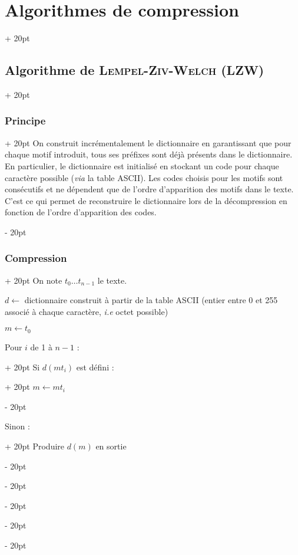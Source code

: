 \documentclass[a4paper, 12pt, twoside]{article}
\newcommand{\ind}[1][20pt]{\advance\leftskip + #1}
\newcommand{\deind}[1][20pt]{\advance\leftskip - #1}
\newenvironment{indt}[2][20pt]{#2 \par \ind[#1]}{\par \deind} %
\begin{document}
\begin{indt}{\section{Algorithmes de compression}}
\begin{indt}{\subsection{Algorithme de \textsc{Lempel-Ziv-Welch} (LZW)}}
            \vspace{12pt}
            
            \begin{indt}{\subsubsection{Principe}}
                On construit incrémentalement le dictionnaire en garantissant que pour chaque motif introduit, tous ses préfixes sont déjà présents dans le dictionnaire.
                En particulier, le dictionnaire est initialisé en stockant un code pour chaque caractère possible (\textit{via} la table ASCII). Les codes choisis pour les motifs sont consécutifs et ne dépendent que de l'ordre d'apparition des motifs dans le texte.
                C'est ce qui permet de reconstruire le dictionnaire lors de la décompression en fonction de l'ordre d'apparition des codes.
            \end{indt}

            \vspace{12pt}
            
            \begin{indt}{\subsubsection{Compression}}
                On note $t_0 \ldots t_{n - 1}$ le texte.

                \begin{pseudocode}
                    $d \leftarrow$ dictionnaire construit à partir de la table ASCII (entier entre 0 et 255 associé à chaque caractère, \textit{i.e} octet possible)

                    $m \leftarrow t_0$

                    \vspace{6pt}
                    
                    \begin{indt}{Pour $i$ de 1 à $ n - 1$ :}
                        \begin{indt}{Si $d(m t_i)$ est défini :}
                            $m \leftarrow m t_i$
                        \end{indt}

                        \vspace{6pt}
                        
                        \begin{indt}{Sinon :}
                            Produire $d(m)$ en sortie


\end{indt}
\end{indt}
\end{pseudocode}
\end{indt}
\end{indt}
\end{indt}
\end{document}
